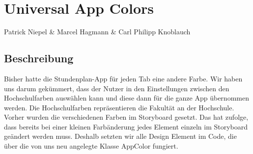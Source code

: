 \chapter{Universal App Colors}
Patrick Niepel \& Marcel Hagmann \& Carl Philipp Knoblauch

\section{Beschreibung}
Bisher hatte die Stundenplan-App für jeden Tab eine andere Farbe. Wir haben uns darum gekümmert, dass der Nutzer in den Einstellungen  zwischen den Hochschulfarben auswählen kann und diese dann für die ganze App übernommen werden. Die Hochschulfarben repräsentieren die Fakultät an der Hochschule. Vorher wurden die verschiedenen Farben im Storyboard gesetzt. Das hat zufolge, dass bereits bei einer kleinen Farbänderung jedes Element einzeln im Storyboard geändert werden muss.
Deshalb setzten wir alle Design Element im Code, die über die von uns neu angelegte Klasse AppColor fungiert.

